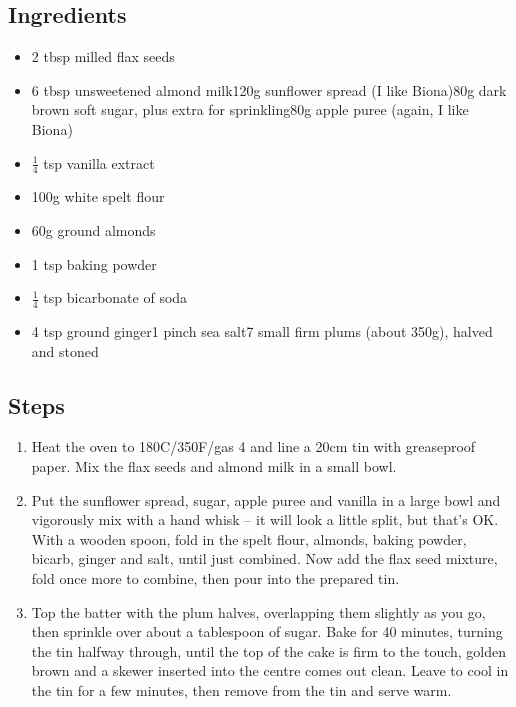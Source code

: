 \documentclass{book}
\begin{document}
\subsection*{Ingredients}
\begin{itemize}
\item 2 tbsp milled flax seeds
\item 6 tbsp unsweetened almond milk120g sunflower spread (I like Biona)80g dark brown soft sugar, plus extra for sprinkling80g apple puree (again, I like Biona)
\item $\frac{1}{4}$ tsp vanilla extract
\item 100g white spelt flour
\item 60g ground almonds
\item 1 tsp baking powder
\item $\frac{1}{4}$ tsp bicarbonate of soda
\item 4 tsp ground ginger1 pinch sea salt7 small firm plums (about 350g), halved and stoned
\end{itemize}

\subsection*{Steps}
\begin{enumerate}
\item Heat the oven to 180C/350F/gas 4 and line a 20cm tin with greaseproof paper. Mix the flax seeds and almond milk in a small bowl.
\item Put the sunflower spread, sugar, apple puree and vanilla in a large bowl and vigorously mix with a hand whisk – it will look a little split, but that’s OK. With a wooden spoon, fold in the spelt flour, almonds, baking powder, bicarb, ginger and salt, until just combined. Now add the flax seed mixture, fold once more to combine, then pour into the prepared tin.
\item Top the batter with the plum halves, overlapping them slightly as you go, then sprinkle over about a tablespoon of sugar. Bake for 40 minutes, turning the tin halfway through, until the top of the cake is firm to the touch, golden brown and a skewer inserted into the centre comes out clean. Leave to cool in the tin for a few minutes, then remove from the tin and serve warm.
\end{enumerate}
\newpage
\end{document}
